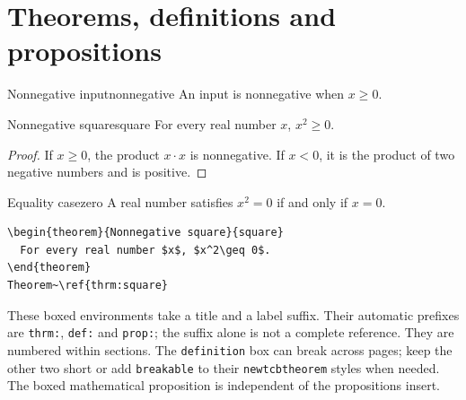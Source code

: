 \section{Theorems, definitions and propositions}
\begin{definition}{Nonnegative input}{nonnegative}
An input is nonnegative when $x\geq 0$.
\end{definition}
\begin{theorem}{Nonnegative square}{square}
For every real number $x$, $x^2\geq 0$.
\end{theorem}
\begin{proof}
If $x\geq0$, the product $x\cdot x$ is nonnegative. If $x<0$, it is the
product of two negative numbers and is positive.
\end{proof}
\begin{proposition}{Equality case}{zero}
A real number satisfies $x^2=0$ if and only if $x=0$.
\end{proposition}
\begin{lstlisting}
\begin{theorem}{Nonnegative square}{square}
  For every real number $x$, $x^2\geq 0$.
\end{theorem}
Theorem~\ref{thrm:square}
\end{lstlisting}
These boxed environments take a title and a label suffix. Their automatic
prefixes are \texttt{thrm:}, \texttt{def:} and \texttt{prop:}; the suffix alone
is not a complete reference. They are numbered within sections. The
\texttt{definition} box can break across pages; keep the other two short or add
\texttt{breakable} to their \texttt{newtcbtheorem} styles when needed.
The boxed mathematical proposition is independent of the propositions insert.
